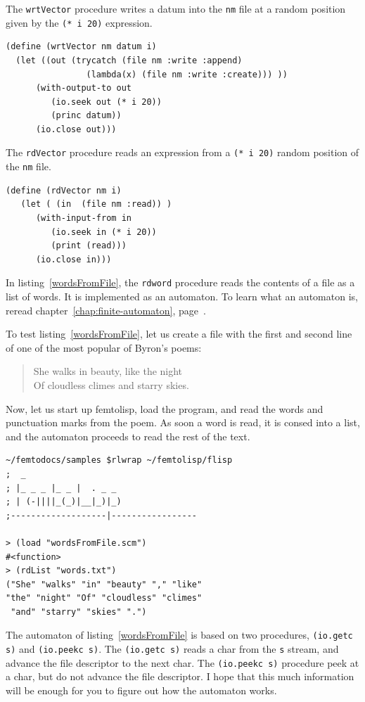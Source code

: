 \documentclass[a4paper,12pt]{book}
\begin{document}
The \verb|wrtVector| procedure writes a datum
into the \verb|nm| file at a
random position given by the \verb|(* i 20)|
expression.

\begin{verbatim}
(define (wrtVector nm datum i)
  (let ((out (trycatch (file nm :write :append)
                (lambda(x) (file nm :write :create))) ))
      (with-output-to out
         (io.seek out (* i 20))
         (princ datum))
      (io.close out)))
\end{verbatim}

The \verb|rdVector| procedure reads
an expression from a \verb|(* i 20)|
random position of the \verb|nm| file.

\begin{verbatim}
(define (rdVector nm i)
   (let ( (in  (file nm :read)) )
      (with-input-from in
         (io.seek in (* i 20))
         (print (read)))
      (io.close in)))
\end{verbatim}

In listing~\ref{wordsFromFile},
the \verb|rdword| procedure reads the
contents of a file as a list of words. 
It is implemented as an
automaton. To learn what an automaton is,
reread chapter~\ref{chap:finite-automaton},
page~\pageref{chap:finite-automaton}.

To test listing~\ref{wordsFromFile}, let
us create a file with the first and
second line of one of the most
popular of Byron's poems:
\begin{quote}
She walks in beauty, like the night\\ 
Of cloudless climes and starry skies.
\end{quote}
Now, let us start up femtolisp, load
the program, and read the words and
punctuation marks from the poem.
As soon a word is read, it is consed
into a list, and the automaton proceeds
to read the rest of the text.
\begin{verbatim}
~/femtodocs/samples $rlwrap ~/femtolisp/flisp
;  _
; |_ _ _ |_ _ |  . _ _
; | (-||||_(_)|__|_)|_)
;-------------------|-----------------

> (load "wordsFromFile.scm")
#<function>
> (rdList "words.txt")
("She" "walks" "in" "beauty" "," "like" 
"the" "night" "Of" "cloudless" "climes"
 "and" "starry" "skies" ".")
\end{verbatim}


The automaton of listing~\ref{wordsFromFile} 
is based on two procedures, \verb|(io.getc s)| and
\verb|(io.peekc s)|. The \verb|(io.getc s)|
reads a char from the \verb|s| stream,
and advance the file descriptor to the
next char. The \verb|(io.peekc s)| procedure
peek at a char, but do not advance the
file descriptor. I hope that this much
information will be enough for you to 
figure out how the automaton works.
\end{document}
